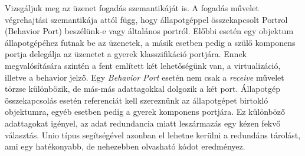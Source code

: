 \documentclass[a4paper,12pt]{report}
\begin{document}
Vizsgáljuk meg az üzenet fogadás szemantikáját is. A fogadás művelet végrehajtási szemantikája attól függ, hogy állapotgéppel összekapcsolt Portrol (Behavior Port) beszélünk-e vagy általános portról. Előbbi esetén egy objektum állapotgépéhez futnak be az üzenetek, a másik esetben pedig a szülő komponens portja delegálja az üzenetet a gyerek klasszifikáció portjára. Ennek megvalósítására szintén a fent említett két lehetőségünk van, a virtualizáció, illetve a behavior jelző. Egy \textit{Behavior Port} esetén nem csak a \textit{receive} művelet törzse különbözik, de más-más adattagokkal dolgozik a két port. Állapotgép összekapcsolás esetén referenciát kell szereznünk az állapotgépet birtokló objektumra, egyéb esetben pedig a gyerek komponens portjára. Ez különböző adattagokat igényel, az adat redundancia miatt leszármazás egy kézen fekvő választás. Unio típus segítségével azonban el lehetne kerülni a redundáns tárolást, ami egy hatékonyabb, de nehezebben olvasható kódot eredményez.
\\
\end{document}
